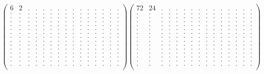 \documentclass[12pt,a4paper]{amsart}
\begin{document}
\begin{align*}
\left(\begin{array}{rrrrrrrrrrrrrrr}%
6&2&.&.&.&.&.&.&.&.&.&.&.&.&.\\%
.&.&.&.&.&.&.&.&.&.&.&.&.&.&.\\%
.&.&.&.&.&.&.&.&.&.&.&.&.&.&.\\%
.&.&.&.&.&.&.&.&.&.&.&.&.&.&.\\%
.&.&.&.&.&.&.&.&.&.&.&.&.&.&.\\%
.&.&.&.&.&.&.&.&.&.&.&.&.&.&.\\%
.&.&.&.&.&.&.&.&.&.&.&.&.&.&.\\%
.&.&.&.&.&.&.&.&.&.&.&.&.&.&.\\%
.&.&.&.&.&.&.&.&.&.&.&.&.&.&.\\%
.&.&.&.&.&.&.&.&.&.&.&.&.&.&.\\%
.&.&.&.&.&.&.&.&.&.&.&.&.&.&.\\%
.&.&.&.&.&.&.&.&.&.&.&.&.&.&.\\%
.&.&.&.&.&.&.&.&.&.&.&.&.&.&.\\%
.&.&.&.&.&.&.&.&.&.&.&.&.&.&.\\%
.&.&.&.&.&.&.&.&.&.&.&.&.&.&.\\%
\end{array}\right)%
\left(\begin{array}{rrrrrrrrrrrrrrr}%
72&24&.&.&.&.&.&.&.&.&.&.&.&.&.\\%
.&.&.&.&.&.&.&.&.&.&.&.&.&.&.\\%
.&.&.&.&.&.&.&.&.&.&.&.&.&.&.\\%
.&.&.&.&.&.&.&.&.&.&.&.&.&.&.\\%
.&.&.&.&.&.&.&.&.&.&.&.&.&.&.\\%
.&.&.&.&.&.&.&.&.&.&.&.&.&.&.\\%
.&.&.&.&.&.&.&.&.&.&.&.&.&.&.\\%
.&.&.&.&.&.&.&.&.&.&.&.&.&.&.\\%
.&.&.&.&.&.&.&.&.&.&.&.&.&.&.\\%
.&.&.&.&.&.&.&.&.&.&.&.&.&.&.\\%
.&.&.&.&.&.&.&.&.&.&.&.&.&.&.\\%
.&.&.&.&.&.&.&.&.&.&.&.&.&.&.\\%
.&.&.&.&.&.&.&.&.&.&.&.&.&.&.\\%
.&.&.&.&.&.&.&.&.&.&.&.&.&.&.\\%
.&.&.&.&.&.&.&.&.&.&.&.&.&.&.\\%
\end{array}\right)%
\end{align*}
\end{document}
